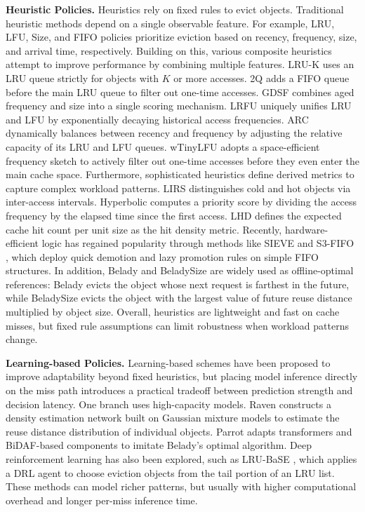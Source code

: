 \documentclass[10pt,journal]{IEEEtran}
\theoremstyle{slantedlemma}
\begin{document}
\textbf{Heuristic Policies.} Heuristics rely on fixed rules to evict objects. Traditional heuristic methods depend on a single observable feature. For example, LRU, LFU, Size, and FIFO policies prioritize eviction based on recency, frequency, size, and arrival time, respectively. Building on this, various composite heuristics attempt to improve performance by combining multiple features. LRU-K \cite{oneilLRUK1993} uses an LRU queue strictly for objects with $K$ or more accesses. 2Q \cite{johnson2Q1994} adds a FIFO queue before the main LRU queue to filter out one-time accesses. GDSF \cite{cherkasovaGDSF1998a} combines aged frequency and size into a single scoring mechanism. LRFU \cite{dongheeleeLRFU2001} uniquely unifies LRU and LFU by exponentially decaying historical access frequencies. ARC \cite{megiddoARC2003} dynamically balances between recency and frequency by adjusting the relative capacity of its LRU and LFU queues. wTinyLFU \cite{einzigerTinyLFU2017} adopts a space-efficient frequency sketch to actively filter out one-time accesses before they even enter the main cache space. Furthermore, sophisticated heuristics define derived metrics to capture complex workload patterns. LIRS \cite{jiangLIRS2002} distinguishes cold and hot objects via inter-access intervals. Hyperbolic \cite{blanksteinHyperbolic2017} computes a priority score by dividing the access frequency by the elapsed time since the first access. LHD \cite{beckmannLHD2018} defines the expected cache hit count per unit size as the hit density metric. Recently, hardware-efficient logic has regained popularity through methods like SIEVE \cite{zhangSIEVE2024} and S3-FIFO \cite{yangs3FIFO2023}, which deploy quick demotion and lazy promotion rules on simple FIFO structures. In addition, Belady \cite{beladyStudy1966} and BeladySize are widely used as offline-optimal references: Belady evicts the object whose next request is farthest in the future, while BeladySize evicts the object with the largest value of future reuse distance multiplied by object size. Overall, heuristics are lightweight and fast on cache misses, but fixed rule assumptions can limit robustness when workload patterns change.

\textbf{Learning-based Policies.} Learning-based schemes have been proposed to improve adaptability beyond fixed heuristics, but placing model inference directly on the miss path introduces a practical tradeoff between prediction strength and decision latency. One branch uses high-capacity models. Raven \cite{huRaven2022} constructs a density estimation network built on Gaussian mixture models to estimate the reuse distance distribution of individual objects. Parrot \cite{liuImitation2020} adapts transformers and BiDAF-based components to imitate Belady's optimal algorithm. Deep reinforcement learning has also been explored, such as LRU-BaSE \cite{wangLRUBase2024}, which applies a DRL agent to choose eviction objects from the tail portion of an LRU list. These methods can model richer patterns, but usually with higher computational overhead and longer per-miss inference time.
\end{document}

